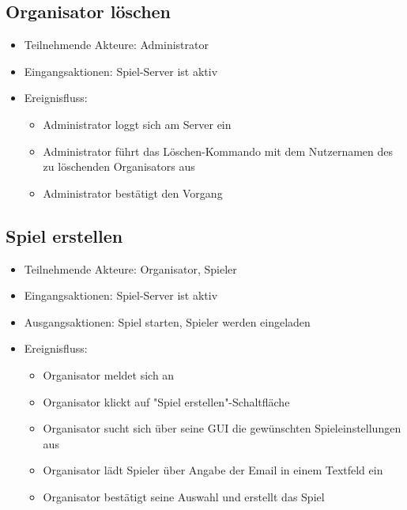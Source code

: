 \documentclass[a4paper]{scrreprt}
\begin{document}
    \subsection{Organisator löschen}
    \begin{itemize}
        \item Teilnehmende Akteure: \Gls{Administrator}
        \item Eingangsaktionen: \Gls{Spiel-Server} ist aktiv
        \item Ereignisfluss:
        \begin{itemize}
            \item \Gls{Administrator} loggt sich am Server ein
            \item \Gls{Administrator} führt das Löschen-Kommando mit dem Nutzernamen des zu löschenden \Gls{Organisator}s aus
            \item \Gls{Administrator} bestätigt den Vorgang
        \end{itemize}
    \end{itemize}

    \subsection{Spiel erstellen}
    \begin{itemize}
        \item Teilnehmende Akteure: \Gls{Organisator}, \Gls{Spieler}
        \item Eingangsaktionen: \Gls{Spiel-Server} ist aktiv
        \item Ausgangsaktionen: \Gls{Spiel} starten, \Gls{Spieler} werden eingeladen
        \item Ereignisfluss:
        \begin{itemize}
            \item \Gls{Organisator} meldet sich an
            \item \Gls{Organisator} klickt auf "Spiel erstellen"-Schaltfläche
            \item \Gls{Organisator} sucht sich über seine GUI die gewünschten \Gls{Spieleinstellungen} aus
            \item \Gls{Organisator} lädt \Gls{Spieler} über Angabe der Email in einem Textfeld ein
            \item \Gls{Organisator} bestätigt seine Auswahl und erstellt das Spiel
        \end{itemize}
    \end{itemize}
\end{document}
